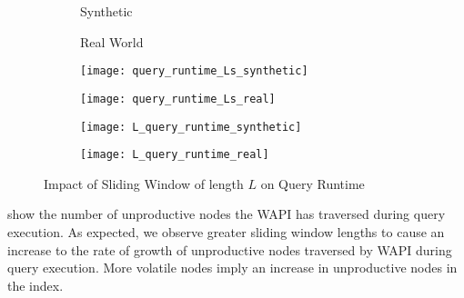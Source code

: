 \documentclass[abstracton,12pt]{scrartcl}
\theoremstyle{definition}
\begin{document}
\begin{figure}
  \centering
  \begin{subfigure}{0.49\linewidth}
    \centering
    Synthetic
  \end{subfigure}
  \begin{subfigure}{0.49\linewidth}
    \centering
    Real World
  \end{subfigure}
  \begin{subfigure}{0.49\linewidth}
    \centering
    \texttt{[image: query\_runtime\_Ls\_synthetic]}
    \caption{}
    \label{fig:query_runtime_Ls_synthetic}
  \end{subfigure}
  \begin{subfigure}{0.49\linewidth}
    \centering
    \texttt{[image: query\_runtime\_Ls\_real]}
    \caption{}
    \label{fig:query_runtime_Ls_real}
  \end{subfigure}
  \begin{subfigure}{0.49\linewidth}
    \centering
    \texttt{[image: L\_query\_runtime\_synthetic]}
    \caption{}
    \label{fig:L_query_runtime_synthetic}
  \end{subfigure}
  \begin{subfigure}{0.49\linewidth}
    \centering
    \texttt{[image: L\_query\_runtime\_real]}
    \caption{}
    \label{fig:L_query_runtime_real}
  \end{subfigure}
  \caption{Impact of Sliding Window of length $L$ on Query Runtime}
\end{figure}


 show the
number of unproductive nodes the WAPI has traversed during query execution. As
expected, we observe greater sliding window lengths to cause an increase to the
rate of growth of unproductive nodes traversed by WAPI during query execution.
More volatile nodes imply an increase in unproductive nodes in the index.
\end{document}
